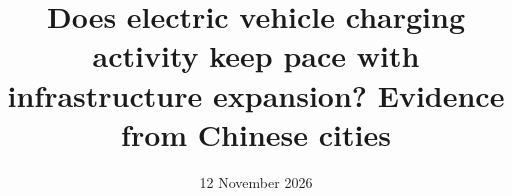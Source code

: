 \documentclass[11pt,a4paper]{article}
\title{Does electric vehicle charging activity keep pace with infrastructure expansion? Evidence from Chinese cities}\author{}\date{12 November 2026}
\begin{document}
\maketitle




\FloatBarrier







\FloatBarrier

\FloatBarrier

\FloatBarrier

\FloatBarrier
\end{document}
